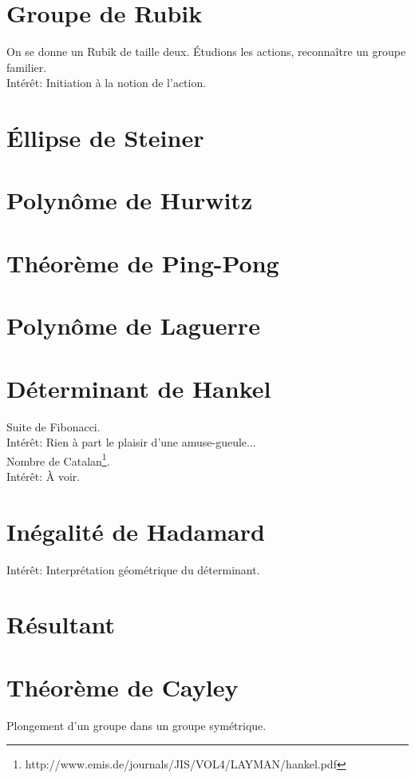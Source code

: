 \documentclass{article}
\begin{document}
\section{Groupe de Rubik}
On se donne un Rubik de taille deux. \'Etudions les actions, reconna\^itre un groupe familier.\\
Int\'er\^et: Initiation \`a la notion de l'action.

\section{\'Ellipse de Steiner}

\section{Polyn\^ome de Hurwitz}

\section{Th\'eor\`eme de Ping-Pong}

\section{Polyn\^ome de Laguerre}

\section{D\'eterminant de Hankel}
Suite de Fibonacci.\\
Int\'er\^et: Rien \`a part le plaisir d'une amuse-gueule...\\
Nombre de Catalan\footnote{http://www.emis.de/journals/JIS/VOL4/LAYMAN/hankel.pdf}.\\
Int\'er\^et: \`A voir.

\section{In\'egalit\'e de Hadamard}
Int\'er\^et: Interpr\'etation g\'eom\'etrique du d\'eterminant.

\section{R\'esultant}

\section{Th\'eor\`eme de Cayley}
Plongement d'un groupe dans un groupe sym\'etrique.
\end{document}

